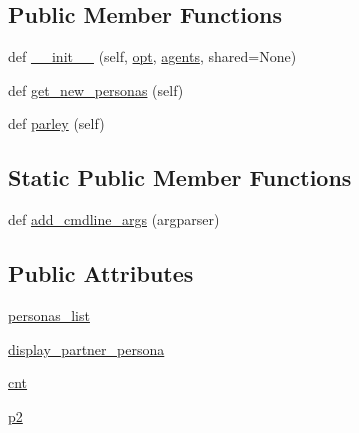 \subsection*{Public Member Functions}
\begin{DoxyCompactItemize}
\item 
def \hyperlink{classparlai_1_1tasks_1_1convai2_1_1worlds_1_1InteractiveWorld_a5fb521abcaeae7438ab08feff1bdfccf}{\+\_\+\+\_\+init\+\_\+\+\_\+} (self, \hyperlink{classparlai_1_1core_1_1worlds_1_1World_a3640d92718acd3e6942a28c1ab3678bd}{opt}, \hyperlink{classparlai_1_1core_1_1worlds_1_1DialogPartnerWorld_a04185d1d55ca86c96c796f12f2226fc9}{agents}, shared=None)
\item 
def \hyperlink{classparlai_1_1tasks_1_1convai2_1_1worlds_1_1InteractiveWorld_acac91ca0d5cfc546437874e2f6d801a3}{get\+\_\+new\+\_\+personas} (self)
\item 
def \hyperlink{classparlai_1_1tasks_1_1convai2_1_1worlds_1_1InteractiveWorld_a75559c133b900cdd71389c9760e9a703}{parley} (self)
\end{DoxyCompactItemize}
\subsection*{Static Public Member Functions}
\begin{DoxyCompactItemize}
\item 
def \hyperlink{classparlai_1_1tasks_1_1convai2_1_1worlds_1_1InteractiveWorld_abcbca63c63937e6399a1ab29cd425274}{add\+\_\+cmdline\+\_\+args} (argparser)
\end{DoxyCompactItemize}
\subsection*{Public Attributes}
\begin{DoxyCompactItemize}
\item 
\hyperlink{classparlai_1_1tasks_1_1convai2_1_1worlds_1_1InteractiveWorld_a544124310a84b4fb70abda3b41df5323}{personas\+\_\+list}
\item 
\hyperlink{classparlai_1_1tasks_1_1convai2_1_1worlds_1_1InteractiveWorld_a88aa6f6d630f6d15551e333260bf8e9a}{display\+\_\+partner\+\_\+persona}
\item 
\hyperlink{classparlai_1_1tasks_1_1convai2_1_1worlds_1_1InteractiveWorld_a3caeecc4c52e4dce168341bbb1519b03}{cnt}
\item 
\hyperlink{classparlai_1_1tasks_1_1convai2_1_1worlds_1_1InteractiveWorld_a8f91a884b0bcb293335e3b7cb6404a1f}{p2}
\end{DoxyCompactItemize}
